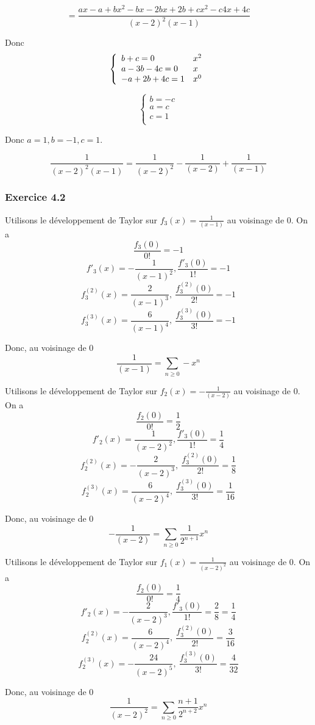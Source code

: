 \documentclass[]{book}
\theoremstyle{definition}
\begin{document}
$$
= \frac{ax-a+bx^2-bx-2bx+2b +cx^2-c4x+4c}{(x-2)^2(x-1)}
$$

Donc
$$ 
\left\{
\begin{array}{l l}
b + c = 0 & x^2\\
a -3b -4c = 0 & x\\
-a +2b +4c = 1 & x^0\\
\end{array}
\right.
$$

$$ 
\left\{
\begin{array}{l}
b = -c  \\
a = c   \\
c = 1 \\
\end{array}
\right.
$$

Donc $a=1, b=-1, c=1$.

$$
\frac{1}{(x-2)^2(x-1)} = \frac{1}{(x-2)^2} - \frac{1}{(x-2)} + \frac{1}{(x-1)}
$$

\subsubsection*{Exercice 4.2}
Utilisons le d\'eveloppement de Taylor sur $f_3(x) = \frac{1}{(x-1)}$ au voisinage de 0. On a 
$$\frac{f_3(0)}{0!} = -1$$
$$f'_3(x) = -\frac{1}{(x-1)^2}, \frac{f'_3(0)}{1!} = -1$$
$$f^{(2)}_3(x) = \frac{2}{(x-1)^3},\ \frac{f^{(2)}_3(0)}{2!} = -1$$
$$f^{(3)}_3(x) = \frac{6}{(x-1)^4},\ \frac{f^{(3)}_3(0)}{3!} = -1$$ 

Donc, au voisinage de 0
$$
\frac{1}{(x-1)} = \sum_{n \ge 0} -x^n
$$

Utilisons le d\'eveloppement de Taylor sur $f_2(x) = -\frac{1}{(x-2)}$ au voisinage de 0. On a 
$$\frac{f_2(0)}{0!} = \frac{1}{2}$$
$$f'_2(x) = \frac{1}{(x-2)^2}, \frac{f'_3(0)}{1!} = \frac{1}{4}$$
$$f^{(2)}_2(x) = -\frac{2}{(x-2)^3},\ \frac{f^{(2)}_3(0)}{2!} = \frac{1}{8}$$
$$f^{(3)}_2(x) = \frac{6}{(x-2)^4},\ \frac{f^{(3)}_3(0)}{3!} = \frac{1}{16}$$ 

Donc, au voisinage de 0
$$
-\frac{1}{(x-2)} = \sum_{n \ge 0} \frac{1}{2^{n+1}}x^n
$$

Utilisons le d\'eveloppement de Taylor sur $f_1(x) = \frac{1}{(x-2)^2}$ au voisinage de 0. On a 
$$\frac{f_2(0)}{0!} = \frac{1}{4}$$
$$f'_2(x) = -\frac{2}{(x-2)^3}, \frac{f'_3(0)}{1!} = \frac{2}{8} = \frac{1}{4}$$
$$f^{(2)}_2(x) = \frac{6}{(x-2)^4},\ \frac{f^{(2)}_3(0)}{2!} = \frac{3}{16}$$
$$f^{(3)}_2(x) = -\frac{24}{(x-2)^5},\ \frac{f^{(3)}_3(0)}{3!} = \frac{4}{32}$$ 

Donc, au voisinage de 0
$$
\frac{1}{(x-2)^2} = \sum_{n \ge 0} \frac{n+1}{2^{n+2}}x^n
$$
\end{document}

